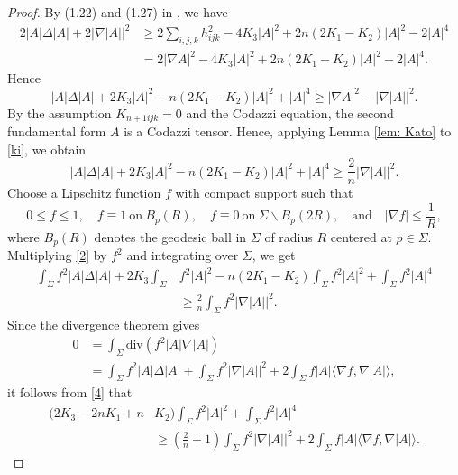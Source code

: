 \documentclass[amssymb,amstex,amsmath,11pt]{article}
\numberwithin{equation}{section}
\theoremstyle{plain}
\theoremstyle{definition}
\theoremstyle{remark}
\newcommand{\lap}{\Delta}
\def\div{\textrm{div}}
\begin{document}
\begin{proof}
By (1.22) and (1.27) in \cite{Schoen&75}, we have
\begin{align*}
2|A|\Delta |A|+2|\nabla |A||^2
&\ge 2\sum_{i,j,k} h_{ijk}^2-4K_3|A|^2+2n(2K_1-K_2)|A|^2-2|A|^4 \\
&=2|\nabla A|^2-4K_3|A|^2+2n(2K_1-K_2)|A|^2-2|A|^4.
\end{align*}
Hence
\begin{equation}\label{ki}
|A|\Delta |A|+2K_3|A|^2-n(2K_1-K_2)|A|^2+|A|^4
\ge
|\nabla A|^2-|\nabla |A||^2.
\end{equation}
By the assumption $K_{n+1ijk}=0$ and the Codazzi equation, the second fundamental form $A$ is a Codazzi tensor. Hence,  applying Lemma \ref{lem: Kato} to \eqref{ki}, we obtain
\begin{equation}\label{2}
|A|\Delta |A|+2K_3|A|^2-n(2K_1-K_2)|A|^2+|A|^4\ge \frac{2}{n}|\nabla |A||^2.
\end{equation}
Choose a Lipschitz function $f$ with compact support such that
\begin{equation} \label{fd}
0\leq f\leq 1,\quad f\equiv 1~ \text{on}~ B_p(R),\quad f\equiv 0~\text{on}~\Sigma \backslash B_p(2R), \quad \text{and} \quad|\nabla f|\leq \frac{1}{R},
\end{equation}
where $B_p(R)$ denotes the geodesic ball in $\Sigma$ of radius $R$ centered at $p \in \Sigma$. Multiplying \eqref{2} by $f^2$ and integrating over $\Sigma$, we get
      \begin{align}\label{4}
        \int_\Sigma f^2|A|\lap|A| + 2K_3\int_\Sigma & f^2|A|^2 -n(2K_1-K_2) \int_\Sigma  f^2|A|^2 +\int_\Sigma f^2|A|^4 \nonumber \\
        & \geq \frac{2}{n}\int_\Sigma f^2|\nabla |A||^2.
    \end{align}
Since the divergence theorem gives
      \begin{align*}
        0 & = \int_\Sigma \div(f^2|A|\nabla|A|) \\
         & = \int_\Sigma f^2|A|\lap|A| + \int_\Sigma f^2|\nabla|A||^2 + 2\int_\Sigma f|A|\langle \nabla f,\nabla|A| \rangle,
    \end{align*}
it follows from \eqref{4} that
      \begin{align}\label{5}
        (2K_3-2nK_1+n&K_2)\int_\Sigma f^2|A|^2  +\int_\Sigma f^2|A|^4  \nonumber\\
        & \geq \left(\frac{2}{n}+1\right)\int_\Sigma f^2|\nabla |A||^2 + 2\int_\Sigma f|A|\langle \nabla f,\nabla|A| \rangle.
    \end{align}

\end{proof}
\end{document}
